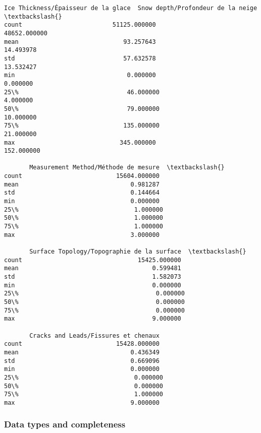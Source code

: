 \documentclass[11pt]{article}
\makeatletter
\newcommand{\boxspacing}{\kern\kvtcb@left@rule\kern\kvtcb@boxsep}
\newcommand{\prompt}[4]{
        {\ttfamily\llap{{\color{#2}[#3]:\hspace{3pt}#4}}\vspace{-\baselineskip}}
    }
\makeatother
\begin{document}
            \begin{tcolorbox}[breakable, size=fbox, boxrule=.5pt, pad at break*=1mm, opacityfill=0]
\prompt{Out}{outcolor}{5}{\boxspacing}
\begin{Verbatim}[commandchars=\\\{\}]
       Ice Thickness/Épaisseur de la glace  Snow depth/Profondeur de la neige  \textbackslash{}
count                         51125.000000                       48652.000000
mean                             93.257643                          14.493978
std                              57.632578                          13.532427
min                               0.000000                           0.000000
25\%                              46.000000                           4.000000
50\%                              79.000000                          10.000000
75\%                             135.000000                          21.000000
max                             345.000000                         152.000000

       Measurement Method/Méthode de mesure  \textbackslash{}
count                          15604.000000
mean                               0.981287
std                                0.144664
min                                0.000000
25\%                                1.000000
50\%                                1.000000
75\%                                1.000000
max                                3.000000

       Surface Topology/Topographie de la surface  \textbackslash{}
count                                15425.000000
mean                                     0.599481
std                                      1.582073
min                                      0.000000
25\%                                      0.000000
50\%                                      0.000000
75\%                                      0.000000
max                                      9.000000

       Cracks and Leads/Fissures et chenaux
count                          15428.000000
mean                               0.436349
std                                0.669096
min                                0.000000
25\%                                0.000000
50\%                                0.000000
75\%                                1.000000
max                                9.000000
\end{Verbatim}
\end{tcolorbox}
        
    \hypertarget{data-types-and-completeness}{%
\subsubsection{Data types and
completeness}\label{data-types-and-completeness}}
\end{document}

